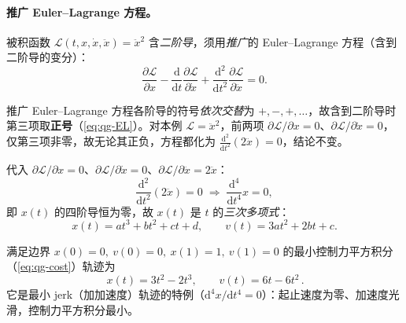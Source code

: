 \paragraph{推广 Euler–Lagrange 方程。}
被积函数 $\mathcal{L}(t,x,\dot x,\ddot x)=\ddot x^2$ 含\emph{二阶导}，须用\emph{推广}的 Euler–Lagrange 方程（含到二阶导的变分）\cite{yu2021quadruped}：
\begin{equation}
  \frac{\partial\mathcal{L}}{\partial x}-\frac{\mathrm{d}}{\mathrm{d}t}\frac{\partial\mathcal{L}}{\partial\dot x}+\frac{\mathrm{d}^2}{\mathrm{d}t^2}\frac{\partial\mathcal{L}}{\partial\ddot x}=0.
  \label{eq:qg-EL}
\end{equation}

\begin{note}[推广 E–L 方程的符号交替]\label{note:qg-ocr-EL}
推广 Euler–Lagrange 方程各阶导的符号\emph{依次交替}为 $+,-,+,\dots$，故含到二阶导时第三项取\textbf{正号}（\cref{eq:qg-EL}）。对本例 $\mathcal{L}=\ddot x^2$，前两项 $\partial\mathcal{L}/\partial x=0$、$\partial\mathcal{L}/\partial\dot x=0$，仅第三项非零，故无论其正负，方程都化为 $\tfrac{\mathrm{d}^2}{\mathrm{d}t^2}(2\ddot x)=0$，结论不变。
\end{note}

代入 $\partial\mathcal{L}/\partial x=0$、$\partial\mathcal{L}/\partial\dot x=0$、$\partial\mathcal{L}/\partial\ddot x=2\ddot x$\cite{yu2021quadruped}：
\begin{equation}
  \frac{\mathrm{d}^2}{\mathrm{d}t^2}(2\ddot x)=0\;\Longrightarrow\;\frac{\mathrm{d}^4}{\mathrm{d}t^4}x=0,
  \label{eq:qg-fourth}
\end{equation}
即 $x(t)$ 的四阶导恒为零，故 $x(t)$ 是 $t$ 的\emph{三次多项式}\cite{yu2021quadruped}：
\begin{equation}
  x(t)=a t^3+b t^2+c t+d,\qquad v(t)=3a t^2+2b t+c.
  \label{eq:qg-cubic}
\end{equation}

\begin{theorem}[归一化最小控制力点到点轨迹]\label{thm:qg-mincontrol}
满足边界 $x(0)=0,\ v(0)=0,\ x(1)=1,\ v(1)=0$ 的最小控制力平方积分（\cref{eq:qg-cost}）轨迹为
\begin{equation}
  \boxed{\,x(t)=3t^2-2t^3,\qquad v(t)=6t-6t^2\,}.
  \label{eq:qg-st}
\end{equation}
它是最小 jerk（加加速度）轨迹的特例（$\mathrm{d}^4x/\mathrm{d}t^4=0$）：起止速度为零、加速度光滑，控制力平方积分最小\cite{yu2021quadruped}。
\end{theorem}

